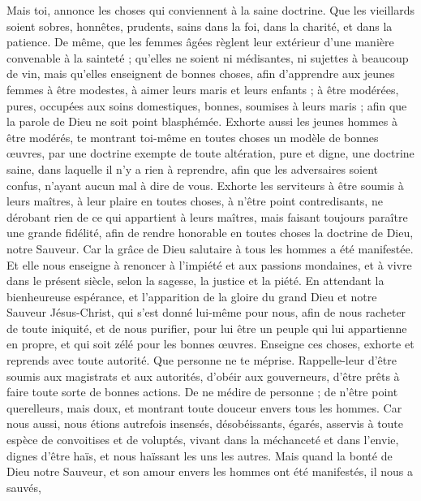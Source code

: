 \begin{multicols}{2}
\VerseOne{}Mais toi, annonce les choses qui conviennent à la saine doctrine.
Que les vieillards soient sobres, honnêtes, prudents, sains dans la foi, dans la charité, et dans la patience.
De même, que les femmes âgées règlent leur extérieur d'une manière convenable à la sainteté ; qu'elles ne soient ni médisantes, ni sujettes à beaucoup de vin, mais qu'elles enseignent de bonnes choses,
afin d’apprendre aux jeunes femmes à être modestes, à aimer leurs maris et leurs enfants ;
à être modérées, pures, occupées aux soins domestiques, bonnes, soumises à leurs maris ; afin que la parole de Dieu ne soit point blasphémée.
Exhorte aussi les jeunes hommes à être modérés,
te montrant toi-même en toutes choses un modèle de bonnes œuvres, par une doctrine exempte de toute altération, pure et digne,
une doctrine saine, dans laquelle il n’y a rien à reprendre, afin que les adversaires soient confus, n'ayant aucun mal à dire de vous.
Exhorte les serviteurs à être soumis à leurs maîtres, à leur plaire en toutes choses, à n’être point contredisants,
ne dérobant rien de ce qui appartient à leurs maîtres, mais faisant toujours paraître une grande fidélité, afin de rendre honorable en toutes choses la doctrine de Dieu, notre Sauveur.
Car la grâce de Dieu salutaire à tous les hommes a été manifestée.
Et elle nous enseigne à renoncer à l'impiété et aux passions mondaines, et à vivre dans le présent siècle, selon la sagesse, la justice et la piété.
En attendant la bienheureuse espérance, et l'apparition de la gloire du grand Dieu et notre Sauveur Jésus-Christ,
qui s'est donné lui-même pour nous, afin de nous racheter de toute iniquité, et de nous purifier, pour lui être un peuple qui lui appartienne en propre, et qui soit zélé pour les bonnes œuvres.
Enseigne ces choses, exhorte et reprends avec toute autorité. Que personne ne te méprise.
\VerseOne{}Rappelle-leur d'être soumis aux magistrats et aux autorités, d'obéir aux gouverneurs, d'être prêts à faire toute sorte de bonnes actions.
De ne médire de personne ; de n'être point querelleurs, mais doux, et montrant toute douceur envers tous les hommes.
Car nous aussi, nous étions autrefois insensés, désobéissants, égarés, asservis à toute espèce de convoitises et de voluptés, vivant dans la méchanceté et dans l’envie, dignes d’être haïs, et nous haïssant les uns les autres.
Mais quand la bonté de Dieu notre Sauveur, et son amour envers les hommes ont été manifestés, il nous a sauvés,

\end{multicols}
